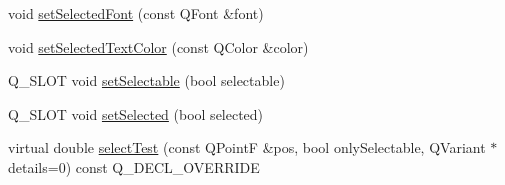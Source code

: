 \begin{DoxyCompactItemize}
\item 
void \hyperlink{class_q_c_p_abstract_legend_item_a91db5aee48617a9d3206e61376807365}{set\+Selected\+Font} (const Q\+Font \&font)
\item 
void \hyperlink{class_q_c_p_abstract_legend_item_a4d01d008ee1a5bfe9905b0397a421936}{set\+Selected\+Text\+Color} (const Q\+Color \&color)
\item 
Q\+\_\+\+S\+L\+OT void \hyperlink{class_q_c_p_abstract_legend_item_a9913ef48730551b696e7f98a2391c599}{set\+Selectable} (bool selectable)
\item 
Q\+\_\+\+S\+L\+OT void \hyperlink{class_q_c_p_abstract_legend_item_a6eed93b0ab99cb3eabb043fb08179c2b}{set\+Selected} (bool selected)
\item 
virtual double \hyperlink{class_q_c_p_abstract_legend_item_a80ec112a6608fc39dbed56239849b187}{select\+Test} (const Q\+PointF \&pos, bool only\+Selectable, Q\+Variant $\ast$details=0) const Q\+\_\+\+D\+E\+C\+L\+\_\+\+O\+V\+E\+R\+R\+I\+DE
\end{DoxyCompactItemize}
